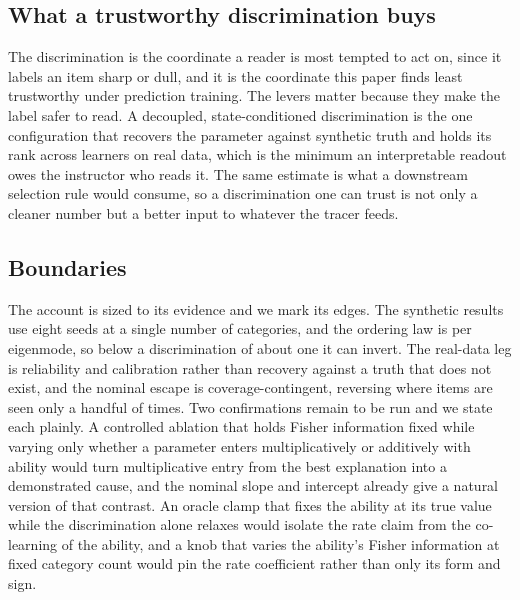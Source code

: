 \documentclass[sigconf,nonacm,screen]{acmart}
\begin{document}
\subsection{What a trustworthy discrimination buys}
The discrimination is the coordinate a reader is most tempted to act on, since it
labels an item sharp or dull, and it is the coordinate this paper finds least
trustworthy under prediction training. The levers matter because they make the label
safer to read. A decoupled, state-conditioned discrimination is the one
configuration that recovers the parameter against synthetic truth and holds its rank
across learners on real data, which is the minimum an interpretable readout owes the
instructor who reads it. The same estimate is what a downstream selection rule would
consume, so a discrimination one can trust is not only a cleaner number but a better
input to whatever the tracer feeds.

\subsection{Boundaries}
The account is sized to its evidence and we mark its edges. The synthetic results
use eight seeds at a single number of categories, and the ordering law is per
eigenmode, so below a discrimination of about one it can invert. The real-data leg
is reliability and calibration rather than recovery against a truth that does not
exist, and the nominal escape is coverage-contingent, reversing where items are seen
only a handful of times. Two confirmations remain to be run and we state each
plainly. A controlled ablation that holds Fisher information fixed while varying only
whether a parameter enters multiplicatively or additively with ability would turn
multiplicative entry from the best explanation into a demonstrated cause, and the
nominal slope and intercept already give a natural version of that contrast. An
oracle clamp that fixes the ability at its true value while the discrimination alone
relaxes would isolate the rate claim from the co-learning of the ability, and a knob
that varies the ability's Fisher information at fixed category count would pin the
rate coefficient rather than only its form and sign.

\end{document}
